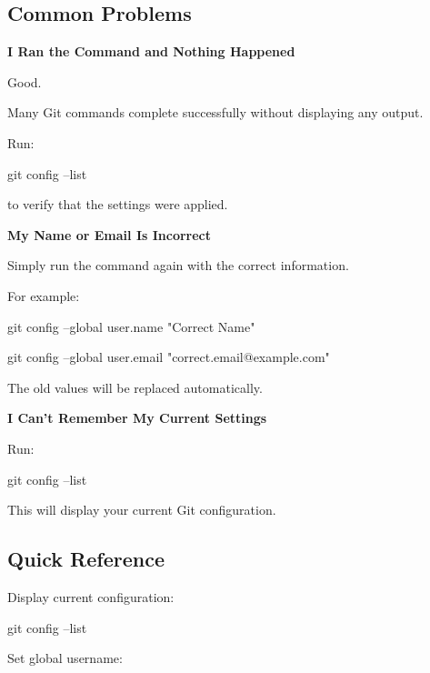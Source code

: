 \documentclass{csc2059practical}
\begin{document}
\subsection{Common Problems}
\begin{commonerror}
\textbf{I Ran the Command and Nothing Happened}\par
\medskip

Good.


Many Git commands complete successfully without displaying any output.


Run:


\begin{terminalplain}
  git config --list
\end{terminalplain}
to verify that the settings were applied.
\end{commonerror}

\begin{commonerror}
\textbf{My Name or Email Is Incorrect}\par
\medskip

Simply run the command again with the correct information.


For example:


\begin{terminalplain}
  git config --global user.name "Correct Name"
\end{terminalplain}
\begin{terminalplain}
  git config --global user.email "correct.email@example.com"
\end{terminalplain}
The old values will be replaced automatically.
\end{commonerror}

\begin{commonerror}
\textbf{I Can't Remember My Current Settings}\par
\medskip

Run:


\begin{terminalplain}
  git config --list
\end{terminalplain}
This will display your current Git configuration.
\end{commonerror}

\subsection{Quick Reference}
Display current configuration:

\begin{terminalplain}
git config --list
\end{terminalplain}
Set global username:
\end{document}
